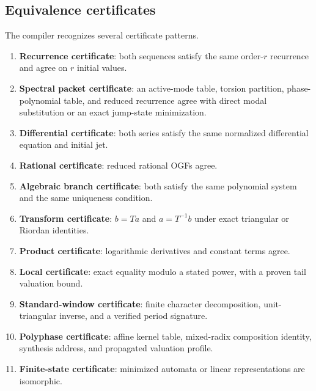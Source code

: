 \documentclass[11pt]{article}
\theoremstyle{definition}\newtheorem{definition}[theorem]{Definition}\newtheorem{example}[theorem]{Example}\newtheorem{construction}[theorem]{Construction}\newtheorem{algorithm}[theorem]{Algorithm}\newtheorem{conjecture}[theorem]{Conjecture}\newtheorem{problem}[theorem]{Problem}
\theoremstyle{remark}\newtheorem{remark}[theorem]{Remark}\newtheorem{boundary}[theorem]{Boundary}\newtheorem{certificate}[theorem]{Computational Certificate}\newtheorem{classical}[theorem]{Classical Input}\newtheorem{principle}[theorem]{Structural Principle}
\begin{document}
\subsection{Equivalence certificates}
The compiler recognizes several certificate patterns.
\begin{enumerate}
\item \textbf{Recurrence certificate}: both sequences satisfy the same order-$r$ recurrence and agree on $r$ initial values.
\item \textbf{Spectral packet certificate}: an active-mode table, torsion partition, phase-polynomial table, and reduced recurrence agree with direct modal substitution or an exact jump-state minimization.
\item \textbf{Differential certificate}: both series satisfy the same normalized differential equation and initial jet.
\item \textbf{Rational certificate}: reduced rational OGFs agree.
\item \textbf{Algebraic branch certificate}: both satisfy the same polynomial system and the same uniqueness condition.
\item \textbf{Transform certificate}: $b=Ta$ and $a=T^{-1}b$ under exact triangular or Riordan identities.
\item \textbf{Product certificate}: logarithmic derivatives and constant terms agree.
\item \textbf{Local certificate}: exact equality modulo a stated power, with a proven tail valuation bound.
\item \textbf{Standard-window certificate}: finite character decomposition, unit-triangular inverse, and a verified period signature.
\item \textbf{Polyphase certificate}: affine kernel table, mixed-radix composition identity, synthesis address, and propagated valuation profile.
\item \textbf{Finite-state certificate}: minimized automata or linear representations are isomorphic.
\end{enumerate}
\end{document}
